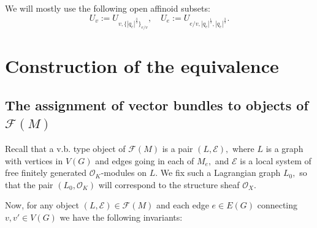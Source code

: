 \documentclass[11pt,leqno]{amsart}
\numberwithin{equation}{section}
\def\Z{\mathbb{Z}}
\newcommand{\xto}{\xrightarrow}
\newcommand{\cF}{{\mathcal F}}
\newcommand{\cO}{{\mathcal O}}
\newcommand{\cE}{{\mathcal E}}
\begin{document}
We will mostly use the following open affinoid subsets:
$$U_v:=U_{v,\{|q_e|^{\frac34}\}_{e/v}},\quad U_e:=U_{e/v,|q_e|^{\frac14},|q_e|^{\frac34}}.$$








\section{Construction of the equivalence}\label{s:equivalence}

\subsection{The assignment of vector bundles to objects of $\cF(M)$} \label{ss:assignbundles}

Recall that a v.b. type object of $\cF(M)$ is a pair $(L,\cE),$ where $L$ is a graph with vertices in $V(G)$ and edges going in each of $M_e,$ and $\cE$ is a local system of free finitely generated $\cO_K$-modules on $L.$ We fix such a Lagrangian graph $L_0,$ so that the pair $(L_0,\cO_K)$ will correspond to the structure sheaf $\cO_X.$

Now, for any object $(L,\cE)\in\cF(M)$ and each edge $e\in E(G)$ connecting $v,v'\in V(G)$ we have the following invariants:
\end{document}
